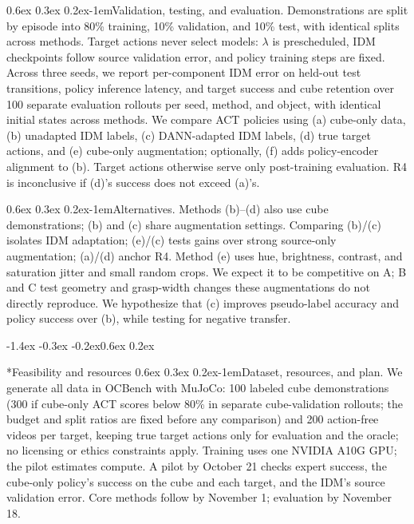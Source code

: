 \documentclass{article}
\makeatletter
\renewcommand{\section}{\@startsection{section}{1}{\z@}%
    {-1.4ex \@plus -0.3ex \@minus -0.2ex}{0.6ex \@plus 0.2ex}{\large\bf\raggedright}}%
\renewcommand{\paragraph}{\@startsection{paragraph}{4}{\z@}%
    {0.6ex \@plus 0.3ex \@minus 0.2ex}{-1em}{\normalsize\bf}}%
\makeatother
\begin{document}
\paragraph{Validation, testing, and evaluation.}
Demonstrations are split by episode into 80\% training, 10\% validation, and 10\% test,
with identical splits across methods. Target actions never select models: $\lambda$ is
prescheduled, IDM checkpoints follow source validation error, and policy training steps
are fixed. Across three seeds, we report per-component IDM error on held-out test
transitions, policy inference latency, and target success and cube retention over 100
separate evaluation rollouts per seed, method, and object, with identical initial states
across methods. We compare ACT policies using (a) cube-only data, (b) unadapted IDM
labels, (c) DANN-adapted IDM labels, (d) true target actions, and (e) cube-only
augmentation; optionally, (f) adds policy-encoder alignment to (b). Target actions
otherwise serve only post-training evaluation. R4 is inconclusive if (d)'s success does
not exceed (a)'s.

\paragraph{Alternatives.}
Methods (b)--(d) also use cube demonstrations; (b) and (c) share augmentation settings.
Comparing (b)/(c) isolates IDM adaptation; (e)/(c) tests gains over strong source-only
augmentation; (a)/(d) anchor R4. Method (e) uses hue, brightness, contrast, and
saturation jitter and small random crops. We expect it to be competitive on A; B and C
test geometry and grasp-width changes these augmentations do not directly reproduce. We
hypothesize that (c) improves pseudo-label accuracy and policy success over (b), while
testing for negative transfer.

\section*{Feasibility and resources}
\paragraph{Dataset, resources, and plan.}
We generate all data in OCBench with MuJoCo: 100 labeled cube demonstrations (300 if
cube-only ACT scores below 80\% in separate cube-validation rollouts; the budget and
split ratios are fixed before any comparison) and 200 action-free videos per target,
keeping true target actions only for evaluation and the oracle; no licensing or ethics
constraints apply. Training uses one NVIDIA A10G GPU; the pilot estimates compute. A
pilot by October 21 checks expert success, the cube-only policy's success on the cube
and each target, and the IDM's source validation error. Core methods follow by November
1; evaluation by November 18.
\end{document}
